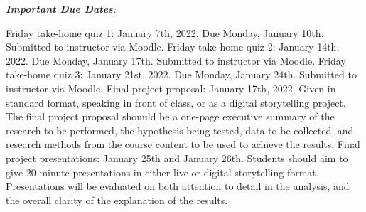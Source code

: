 \documentclass[10pt]{article}
\begin{document}
\textit{\textbf{Important Due Dates}:}
\begin{outline}[enumerate]
\1 Friday take-home quiz 1: January 7th, 2022.  Due Monday, January 10th.  Submitted to instructor via Moodle.
\1 Friday take-home quiz 2: January 14th, 2022.  Due Monday, January 17th.  Submitted to instructor via Moodle.
\1 Friday take-home quiz 3: January 21st, 2022.  Due Monday, January 24th.  Submitted to instructor via Moodle.
\1 Final project proposal: January 17th, 2022.  Given in standard format, speaking in front of class, or as a digital storytelling project.  The final project proposal shouuld be a one-page executive summary of the research to be performed, the hypothesis being tested, data to be collected, and research methods from the course content to be used to achieve the results.
\1 Final project presentations: January 25th and January 26th.  Students should aim to give 20-minute presentations in either live or digital storytelling format.  Presentations will be evaluated on both attention to detail in the analysis, and the overall clarity of the explanation of the results.
\end{outline}
\end{document}
